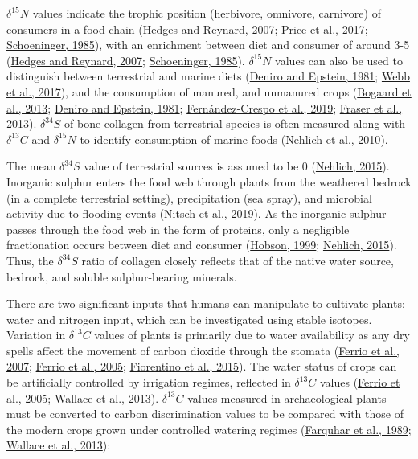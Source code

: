 \documentclass[preprint, 3p, authoryear]{elsarticle} %
\begin{document}
\(\delta ^{15}N\) values indicate the trophic position (herbivore, omnivore, carnivore) of consumers in a food chain (\protect\hyperlink{ref-hedges_reynard07}{Hedges and Reynard, 2007}; \protect\hyperlink{ref-price_etal17}{Price et al., 2017}; \protect\hyperlink{ref-schoeninger85}{Schoeninger, 1985}), with an enrichment between diet and consumer of around 3-5\text{\textperthousand} (\protect\hyperlink{ref-hedges_reynard07}{Hedges and Reynard, 2007}; \protect\hyperlink{ref-schoeninger85}{Schoeninger, 1985}). \(\delta ^{15}N\) values can also be used to distinguish between terrestrial and marine diets (\protect\hyperlink{ref-deniro_epstein81}{Deniro and Epstein, 1981}; \protect\hyperlink{ref-webb_etal17a}{Webb et al., 2017}), and the consumption of manured, and unmanured crops (\protect\hyperlink{ref-bogaard_etal13}{Bogaard et al., 2013}; \protect\hyperlink{ref-deniro_epstein81}{Deniro and Epstein, 1981}; \protect\hyperlink{ref-fernandez-crespo_etal19}{Fernández-Crespo et al., 2019}; \protect\hyperlink{ref-fraser_etal13a}{Fraser et al., 2013}). \(\delta ^{34}S\) of bone collagen from terrestrial species is often measured along with \(\delta ^{13}C\) and \(\delta ^{15}N\) to identify consumption of marine foods (\protect\hyperlink{ref-nehlich_etal10}{Nehlich et al., 2010}).

The mean \(\delta ^{34}S\) value of terrestrial sources is assumed to be 0\text{\textperthousand} (\protect\hyperlink{ref-nehlich15}{Nehlich, 2015}). Inorganic sulphur enters the food web through plants from the weathered bedrock (in a complete terrestrial setting), precipitation (sea spray), and microbial activity due to flooding events (\protect\hyperlink{ref-nitsch_etal19}{Nitsch et al., 2019}). As the inorganic sulphur passes through the food web in the form of proteins, only a negligible fractionation occurs between diet and consumer (\protect\hyperlink{ref-hobson99}{Hobson, 1999}; \protect\hyperlink{ref-nehlich15}{Nehlich, 2015}). Thus, the \(\delta ^{34}S\) ratio of collagen closely reflects that of the native water source, bedrock, and soluble sulphur-bearing minerals.

There are two significant inputs that humans can manipulate to cultivate plants: water and nitrogen input, which can be investigated using stable isotopes. Variation in \(\delta ^{13}C\) values of plants is primarily due to water availability as any dry spells affect the movement of carbon dioxide through the stomata (\protect\hyperlink{ref-ferrio_etal07}{Ferrio et al., 2007}; \protect\hyperlink{ref-ferrio_etal05}{Ferrio et al., 2005}; \protect\hyperlink{ref-fiorentino_etal15}{Fiorentino et al., 2015}). The water status of crops can be artificially controlled by irrigation regimes, reflected in \(\delta ^{13}C\) values (\protect\hyperlink{ref-ferrio_etal05}{Ferrio et al., 2005}; \protect\hyperlink{ref-wallace_etal13}{Wallace et al., 2013}). \(\delta ^{13}C\) values measured in archaeological plants must be converted to carbon discrimination values to be compared with those of the modern crops grown under controlled watering regimes (\protect\hyperlink{ref-farquhar_etal89}{Farquhar et al., 1989}; \protect\hyperlink{ref-wallace_etal13}{Wallace et al., 2013}):
\end{document}
